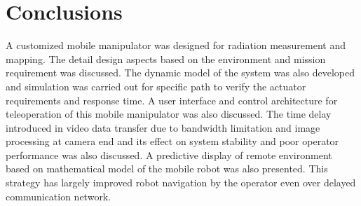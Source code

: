 \documentclass[12pt,a4paper, notitlepage]{article}
\begin{document}
 \section{Conclusions}
 A customized mobile manipulator was designed for radiation measurement and mapping. The detail design aspects  based on the environment and mission requirement was discussed. The dynamic model of the system was also developed and simulation was carried out for specific path to verify the actuator requirements  and response time. A user interface and control architecture for teleoperation of this mobile manipulator was also discussed. The time delay introduced in video data transfer due to bandwidth limitation and image processing at camera end and its effect on system stability and poor operator performance  was also discussed. A predictive display of remote environment based on mathematical model of the mobile  robot was also presented. This strategy has largely  improved robot navigation by the operator even over delayed  communication network.  













	\singlespacing
	
	
\end{document}
